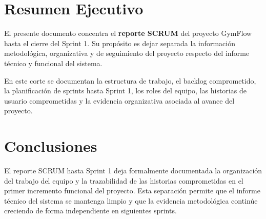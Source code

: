 \documentclass[12pt,letterpaper]{article}
\begin{document}

\clearpage
\tableofcontents
\clearpage

\section{Resumen Ejecutivo}

El presente documento concentra el \textbf{reporte SCRUM} del proyecto GymFlow hasta el cierre del Sprint 1. Su propósito es dejar separada la información metodológica, organizativa y de seguimiento del proyecto respecto del informe técnico y funcional del sistema.

En este corte se documentan la estructura de trabajo, el backlog comprometido, la planificación de sprints hasta Sprint 1, los roles del equipo, las historias de usuario comprometidas y la evidencia organizativa asociada al avance del proyecto.



\section{Conclusiones}

El reporte SCRUM hasta Sprint 1 deja formalmente documentada la organización del trabajo del equipo y la trazabilidad de las historias comprometidas en el primer incremento funcional del proyecto. Esta separación permite que el informe técnico del sistema se mantenga limpio y que la evidencia metodológica continúe creciendo de forma independiente en siguientes sprints.
\end{document}
